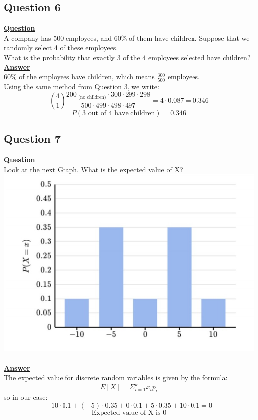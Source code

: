 \documentclass[a4, 12pt,titlepage]{scrartcl}
\begin{document}
\subsection{Question 6}
\textbf{\underline{Question}}\\
A company has 500 employees, and 60\% of them have children.
Suppose that we randomly select 4 of these employees.\\
What is the probability that exactly 3 of the 4 employees selected have children?
\smallskip\\
\textbf{\underline{Answer}}\\
60\% of the employees have children, which means $\frac{300}{500}$ employees.\\
Using the same method from Question 3, we write:\[
\binom{4}{1}\frac{200_{\textrm{ (no children)}}\cdot 300 \cdot 299 \cdot 298}{500 \cdot 499 \cdot 498 \cdot 497}=4\cdot 0.087=0.346
\]
\[
\boxed{P(\textrm{3 out of 4 have children})=0.346}
\]
\newpage

\subsection{Question 7}
\textbf{\underline{Question}}\\
Look at the next Graph. What is the expected value of X?\\
\includegraphics{DSgraph2.jpg}\\
\smallskip\\
\textbf{\underline{Answer}}\\
The expected value for discrete random variables is given by the formula:\[
E[X]=\Sigma^{k}_{i=1}x_i p_i
\]
so in our case:\[
-10\cdot 0.1+(-5)\cdot0.35+ 0\cdot 0.1 +5 \cdot 0.35 +10\cdot 0.1=0
\]
\[
\boxed{\textrm{Expected value of X is 0}}
\]
\end{document}
